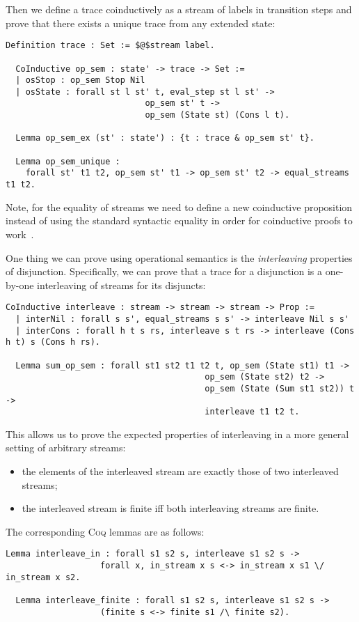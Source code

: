 Then we define a trace coinductively as a stream of labels in transition steps and prove that there exists a unique trace from any extended state:

\begin{lstlisting}[language=Coq]
  Definition trace : Set := $@$stream label.

  CoInductive op_sem : state' -> trace -> Set :=
  | osStop : op_sem Stop Nil
  | osState : forall st l st' t, eval_step st l st' ->
                            op_sem st' t ->
                            op_sem (State st) (Cons l t).

  Lemma op_sem_ex (st' : state') : {t : trace & op_sem st' t}.

  Lemma op_sem_unique :
    forall st' t1 t2, op_sem st' t1 -> op_sem st' t2 -> equal_streams t1 t2.
\end{lstlisting}

Note, for the equality of streams we need to define a new coinductive proposition instead of using the standard syntactic equality in order for coinductive proofs to work~\cite{CPDT}.

One thing we can prove using operational semantics is the \emph{interleaving} properties of disjunction. Specifically, we can prove that a trace for a disjunction is
a one-by-one interleaving of streams for its disjuncts:

\begin{lstlisting}[language=Coq]
  CoInductive interleave : stream -> stream -> stream -> Prop :=
  | interNil : forall s s', equal_streams s s' -> interleave Nil s s'
  | interCons : forall h t s rs, interleave s t rs -> interleave (Cons h t) s (Cons h rs).

  Lemma sum_op_sem : forall st1 st2 t1 t2 t, op_sem (State st1) t1 ->
                                        op_sem (State st2) t2 ->
                                        op_sem (State (Sum st1 st2)) t ->
                                        interleave t1 t2 t.
\end{lstlisting}

This allows us to prove the expected properties of interleaving in a more general setting of arbitrary streams:

\begin{itemize}
\item  the elements of the interleaved stream are exactly those of two interleaved streams;
\item  the interleaved stream is finite iff both interleaving streams are finite.
\end{itemize}

The corresponding \textsc{Coq} lemmas are as follows:

\begin{lstlisting}[language=Coq]
  Lemma interleave_in : forall s1 s2 s, interleave s1 s2 s ->
                   forall x, in_stream x s <-> in_stream x s1 \/ in_stream x s2.

  Lemma interleave_finite : forall s1 s2 s, interleave s1 s2 s ->
                   (finite s <-> finite s1 /\ finite s2).
\end{lstlisting}
